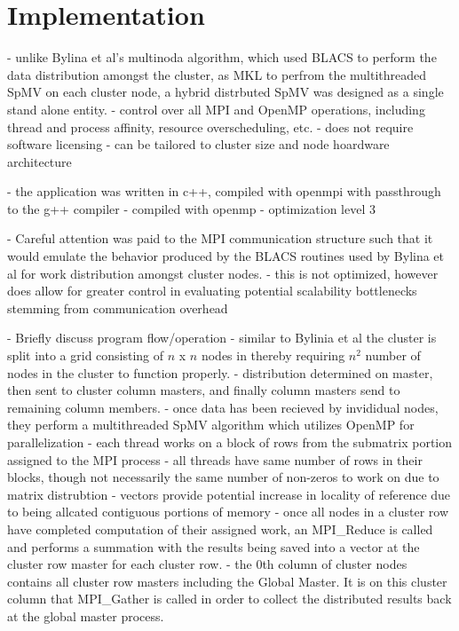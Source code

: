 \section{Implementation}\label{sec:dspmv-implementation}

- unlike Bylina et al's multinoda algorithm, which used BLACS to perform the data distribution amongst the cluster, as MKL to perfrom the multithreaded SpMV on each cluster node, a hybrid distrbuted SpMV was designed as a single stand alone entity. 
	- control over all MPI and OpenMP operations, including thread and process affinity, resource overscheduling, etc.
	- does not require software licensing
	- can be tailored to cluster size and node hoardware architecture
	
- the application was written in c++, compiled with openmpi with passthrough to the g++ compiler
	- compiled with openmp 
	- optimization level 3
	
- Careful attention was paid to the MPI communication structure such that it would emulate the behavior produced by the BLACS routines used by Bylina et al for work distribution amongst cluster nodes. 
	- this is not optimized, however does allow for greater control in evaluating potential scalability bottlenecks stemming from communication overhead
	
- Briefly discuss program flow/operation
	- similar to Bylinia et al the cluster is split into a grid consisting of $n$ x $n$ nodes in thereby requiring $n^2$ number of nodes in the cluster to function properly.
	- distribution determined on master, then sent to cluster column masters, and finally column masters send to remaining column members. 
	- once data has been recieved by invididual nodes, they perform a multithreaded SpMV algorithm which utilizes OpenMP for parallelization
		- each thread works on a block of rows from the submatrix portion assigned to the MPI process
		- all threads have same number of rows in their blocks, though not necessarily the same number of non-zeros to work on due to matrix distrubtion
	- vectors provide potential increase in locality of reference due to being allcated contiguous portions of memory 
	- once all nodes in a cluster row have completed computation of their assigned work, an MPI\_Reduce is called and performs a summation with the results being saved into a vector at the cluster row master for each cluster row. 
	- the 0th column of cluster nodes contains all cluster row masters including the Global Master. It is on this cluster column that MPI\_Gather is called in order to collect the distributed results back at the global master process. 

	
